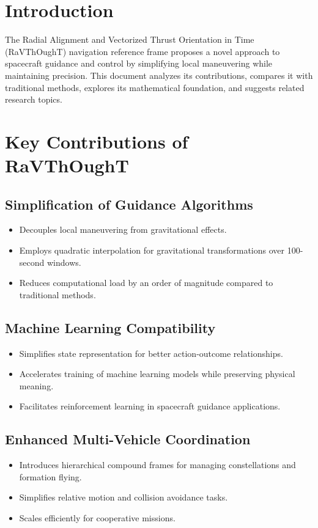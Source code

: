 % 

\section{Introduction}

The Radial Alignment and Vectorized Thrust Orientation in Time (RaVThOughT) navigation reference frame proposes a novel approach to spacecraft guidance and control by simplifying local maneuvering while maintaining precision. This document analyzes its contributions, compares it with traditional methods, explores its mathematical foundation, and suggests related research topics.

\section{Key Contributions of RaVThOughT}

\subsection{Simplification of Guidance Algorithms}
\begin{itemize}
	\item Decouples local maneuvering from gravitational effects.
	\item Employs quadratic interpolation for gravitational transformations over 100-second windows.
	\item Reduces computational load by an order of magnitude compared to traditional methods.
\end{itemize}

\subsection{Machine Learning Compatibility}
\begin{itemize}
	\item Simplifies state representation for better action-outcome relationships.
	\item Accelerates training of machine learning models while preserving physical meaning.
	\item Facilitates reinforcement learning in spacecraft guidance applications.
\end{itemize}

\subsection{Enhanced Multi-Vehicle Coordination}
\begin{itemize}
	\item Introduces hierarchical compound frames for managing constellations and formation flying.
	\item Simplifies relative motion and collision avoidance tasks.
	\item Scales efficiently for cooperative missions.
\end{itemize}

